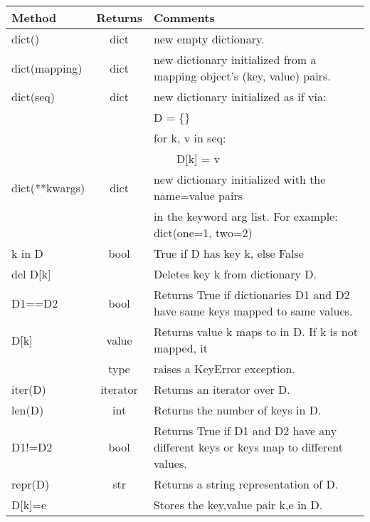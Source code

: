 \begin{center}
{\small
\begin{tabular}{|l|c|p{2.8in}|} \hline
{\bf Method} & {\bf Returns} & {\bf Comments} \\ \hline\hline 

  dict() & dict & new empty dictionary. \\ \hline
   dict(mapping) & dict & new dictionary initialized from a mapping object's (key, value) pairs. \\ \hline
   
   dict(seq) & dict & new dictionary initialized as if via: \\
 & &      D  = \{\} \\
 & &      for k, v in seq: \\
 & &      ~~~~D[k] = v \\ \hline
           
   dict(**kwargs) & dict & new dictionary initialized with the name=value pairs \\
 & &      in the keyword arg list.  For example:  dict(one=1, two=2) \\ \hline

   
   k in D & bool &  True if D has key k, else False \\ \hline
   
   del D[k] & & Deletes key k from dictionary D. \\ \hline
   
    D1==D2 & bool & Returns True if dictionaries D1 and D2 have same keys mapped to same values. \\ \hline
   
     D[k] & value & Returns value k maps to in D. If k is not mapped, it \\ 
     & type & raises a KeyError exception. \\ \hline
   
    iter(D) & iterator & Returns an iterator over D. \\ \hline
   
    len(D) & int & Returns the number of keys in D. \\ \hline
    
    D1!=D2 & bool & Returns True if D1 and D2 have any different keys or keys map to different values. \\ \hline
   
    repr(D) & str & Returns a string representation of D. \\ \hline
   
   D[k]=e & & Stores the key,value pair k,e in D. \\ \hline
 

\end{tabular}}
\end{center}
